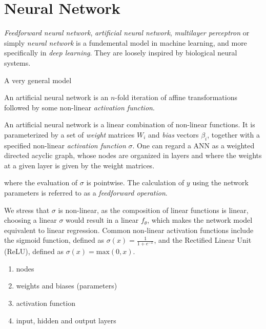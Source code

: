 \documentclass[../../thesis.tex]{subfiles}
\begin{document}



\section{Neural Network}

\textit{Feedforward neural network}, \textit{artificial neural network}, \textit{multilayer perceptron} or simply \textit{neural network} is a fundemental model in machine learning, and more specifically in \textit{deep learning}. They are loosely inspired by biological neural systems.


A very general model


An artificial neural network is an $n$-fold iteration of affine transformations followed by some non-linear \textit{activation function}.

An artificial neural network is a linear combination of non-linear functions. It is parameterized by a set of \textit{weight} matrices $W_i$ and \textit{bias} vectors $\beta_i$, together with a specified non-linear \textit{activation function} $\sigma$. One can regard a ANN as a weighted directed acyclic graph, whose nodes are organized in layers and where the weights at a given layer is given by the weight matrices.


where the evaluation of $\sigma$ is pointwise. The calculation of $y$ using the network parameters is referred to as a \textit{feedforward operation}.

We stress that $\sigma$ is non-linear, as the composition of linear functions is linear, choosing a linear $\sigma$ would result in a linear $f_\theta$, which makes the network model equivalent to linear regression. Common non-linear activation functions include the sigmoid function, defined as $\sigma(x) = \frac{1}{1+e^{-x}}$, and the Rectified Linear Unit (ReLU), defined as $\sigma(x) = \text{max}(0, x)$. 

\begin{enumerate}
    \item nodes
    \item weights and biases (parameters)
    \item activation function
    \item input, hidden and output layers
\end{enumerate}
\end{document}
